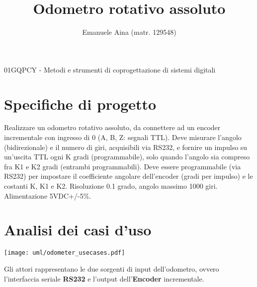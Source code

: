 \documentclass [11pt,a4paper,oneside]{article}
\title{Odometro rotativo assoluto}
\author{Emanuele Aina (matr. 129548)}
\date{}
\newcommand{\component}[1]{\textbf{#1}}
\begin{document}
\maketitle

\begin{center}
\small{01GQPCY - Metodi e strumenti di coprogettazione di sistemi digitali }
\end{center}

\section{Specifiche di progetto}
Realizzare un odometro rotativo assoluto, da connettere ad un encoder
incrementale con ingresso di 0 (A, B, Z: segnali TTL). Deve misurare l'angolo
(bidirezionale) e il numero di giri, acquisibili via RS232, e fornire un
impulso su un'uscita TTL ogni K gradi (programmabile), solo quando l'angolo
sia compreso fra K1 e K2 gradi (entrambi programmabili). Deve essere
programmabile (via RS232) per impostare il coefficiente angolare dell'encoder
(gradi per impulso) e le costanti K, K1 e K2. Risoluzione 0.1 grado, angolo
massimo 1000 giri. Alimentazione 5VDC+/-5\%.

\section{Analisi dei casi d'uso}
\begin{center}
    \texttt{[image: uml/odometer\_usecases.pdf]}
    \label{usecases}
\end{center}

Gli attori rappresentano le due sorgenti di input dell'odometro,
ovvero l'interfaccia seriale \component{RS232} e l'output
dell'\component{Encoder} incrementale.
\end{document}
